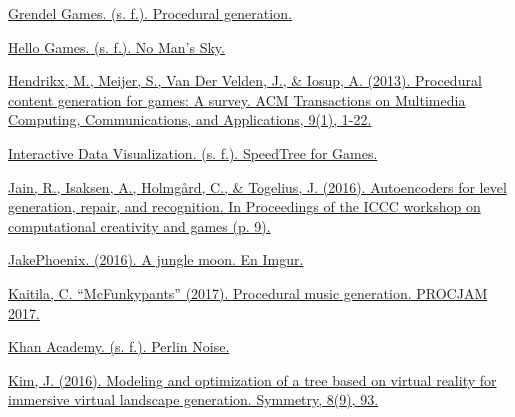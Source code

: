 \begin{thebibliography}{1}
	
	\href{https://grendelgames.com/procedural-generation/}{Grendel Games. (s. f.). Procedural generation.}
	
	
	
	\href{https://www.nomanssky.com/}{Hello Games. (s. f.). No Man’s Sky.}
	
	
	\href{https://doi.org/10.1145/2422956.2422957}{Hendrikx, M., Meijer, S., Van Der Velden, J., \& Iosup, A. (2013). Procedural content generation for games: A survey. ACM Transactions on Multimedia Computing, Communications, and Applications, 9(1), 1-22.}
	
	
	
	\href{https://store.speedtree.com/games/}{Interactive Data Visualization. (s. f.). SpeedTree for Games.}
	
	
	
	\href{http://julian.togelius.com/Jain2016Autoencoders.pdf}{Jain, R., Isaksen, A., Holmgård, C., \& Togelius, J. (2016). Autoencoders for level generation, repair, and recognition. In Proceedings of the ICCC workshop on computational creativity and games (p. 9).}
	
	
	\href{https://imgur.com/gallery/XlGEy}{JakePhoenix. (2016). A jungle moon. En Imgur.}
	
	
	
	\href{https://www.procjam.com/tutorials/en/music/}{Kaitila, C. ``McFunkypants'' (2017). Procedural music generation. PROCJAM 2017.}

	
	\href{https://www.khanacademy.org/computing/computer-programming/programming-natural-simulations/programming-noise/a/perlin-noise}{Khan Academy. (s. f.). Perlin Noise.}
	
	
	\href{https://doi.org/10.3390/sym8090093}{Kim, J. (2016). Modeling and optimization of a tree based on virtual reality for immersive virtual landscape generation. Symmetry, 8(9), 93.}
	

\end{thebibliography}
